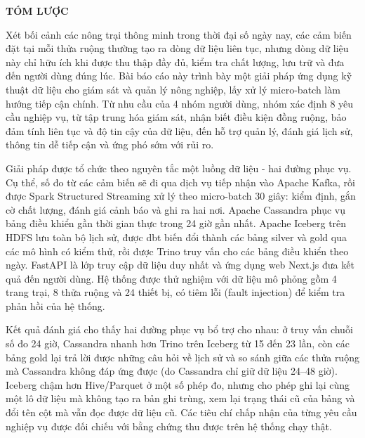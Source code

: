 \newpage
\thispagestyle{plain}
\begin{center}
    \textbf{TÓM LƯỢC}
\end{center}

Xét bối cảnh các nông trại thông minh trong thời đại số ngày nay, các cảm biến đặt tại mỗi thửa ruộng thường tạo ra dòng dữ liệu liên tục, nhưng dòng dữ liệu này chỉ hữu ích khi được thu thập đầy đủ, kiểm tra chất lượng, lưu trữ và đưa đến người dùng đúng lúc. Bài báo cáo này trình bày một giải pháp ứng dụng kỹ thuật dữ liệu cho giám sát và quản lý nông nghiệp, lấy xử lý micro-batch làm hướng tiếp cận chính. Từ nhu cầu của 4 nhóm người dùng, nhóm xác định 8 yêu cầu nghiệp vụ, từ tập trung hóa giám sát, nhận biết điều kiện đồng ruộng, bảo đảm tính liên tục và độ tin cậy của dữ liệu, đến hỗ trợ quản lý, đánh giá lịch sử, thông tin dễ tiếp cận và ứng phó sớm với rủi ro.

Giải pháp được tổ chức theo nguyên tắc một luồng dữ liệu - hai đường phục vụ. Cụ thể, số đo từ các cảm biến sẽ đi qua dịch vụ tiếp nhận vào Apache Kafka, rồi được Spark Structured Streaming xử lý theo micro-batch 30 giây: kiểm định, gắn cờ chất lượng, đánh giá cảnh báo và ghi ra hai nơi. Apache Cassandra phục vụ bảng điều khiển gần thời gian thực trong 24 giờ gần nhất. Apache Iceberg trên HDFS lưu toàn bộ lịch sử, được dbt biến đổi thành các bảng silver và gold qua các mô hình có kiểm thử, rồi được Trino truy vấn cho các bảng điều khiển theo ngày. FastAPI là lớp truy cập dữ liệu duy nhất và ứng dụng web Next.js đưa kết quả đến người dùng. Hệ thống được thử nghiệm với dữ liệu mô phỏng gồm 4 trang trại, 8 thửa ruộng và 24 thiết bị, có tiêm lỗi (fault injection) để kiểm tra phản hồi của hệ thống.

Kết quả đánh giá cho thấy hai đường phục vụ bổ trợ cho nhau: ở truy vấn chuỗi số đo 24 giờ, Cassandra nhanh hơn Trino trên Iceberg từ 15 đến 23 lần, còn các bảng gold lại trả lời được những câu hỏi về lịch sử và so sánh giữa các thửa ruộng mà Cassandra không đáp ứng được (do Cassandra chỉ giữ dữ liệu 24--48 giờ). Iceberg chậm hơn Hive/Parquet ở một số phép đo, nhưng cho phép ghi lại cùng một lô dữ liệu mà không tạo ra bản ghi trùng, xem lại trạng thái cũ của bảng và đổi tên cột mà vẫn đọc được dữ liệu cũ. Các tiêu chí chấp nhận của từng yêu cầu nghiệp vụ được đối chiếu với bằng chứng thu được trên hệ thống chạy thật.
